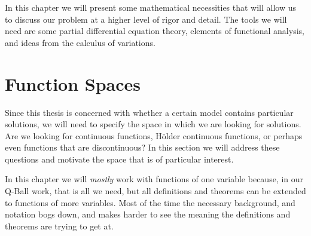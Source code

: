 
In this chapter we will present some mathematical necessities that will allow us
to discuss our problem at a higher level of rigor and detail. The tools we will
need are some partial differential equation theory, elements of functional
analysis, and ideas from the calculus of variations.

\section{Function Spaces}\label{sec:funspaces}
Since this thesis is concerned with whether a certain model contains particular
solutions, we will need to specify the space in which we are looking for
solutions. Are we looking for continuous functions, H\"{o}lder continuous
functions, or perhaps even functions that are discontinuous? In this section we
will address these questions and motivate the space that is of particular
interest.

In this chapter we will \textit{mostly} work with functions of one variable
because, in our Q-Ball work, that is all we need, but all definitions and
theorems can be extended to functions of more variables. Most of the time the
necessary background, and notation bogs down, and makes harder to see the
meaning the definitions and theorems are trying to get at.

